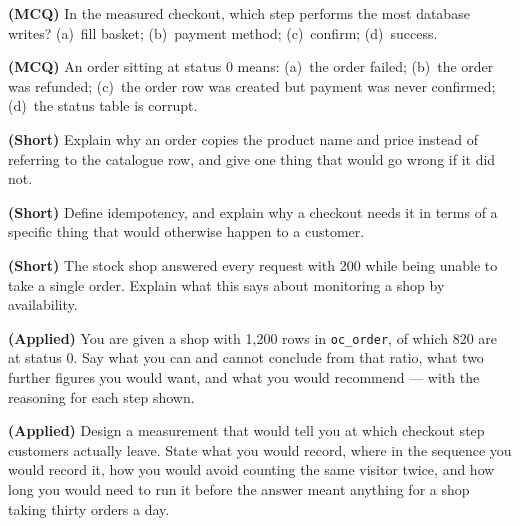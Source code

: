 \begin{reviewq}
  \item \textbf{(MCQ)} In the measured checkout, which step performs the most
        database writes? (a)~fill basket; (b)~payment method; (c)~confirm;
        (d)~success.
  \item \textbf{(MCQ)} An order sitting at status 0 means: (a)~the order
        failed; (b)~the order was refunded; (c)~the order row was created but
        payment was never confirmed; (d)~the status table is corrupt.
  \item \textbf{(Short)} Explain why an order copies the product name and price
        instead of referring to the catalogue row, and give one thing that
        would go wrong if it did not.
  \item \textbf{(Short)} Define idempotency, and explain why a checkout needs
        it in terms of a specific thing that would otherwise happen to a
        customer.
  \item \textbf{(Short)} The stock shop answered every request with 200 while
        being unable to take a single order. Explain what this says about
        monitoring a shop by availability.
  \item \textbf{(Applied)} You are given a shop with 1{,}200 rows in
        \texttt{oc\_order}, of which 820 are at status 0. Say what you can and
        cannot conclude from that ratio, what two further figures you would
        want, and what you would recommend --- with the reasoning for each
        step shown.
  \item \textbf{(Applied)} Design a measurement that would tell you at which
        checkout step customers actually leave. State what you would record,
        where in the sequence you would record it, how you would avoid counting
        the same visitor twice, and how long you would need to run it before
        the answer meant anything for a shop taking thirty orders a day.
\end{reviewq}
